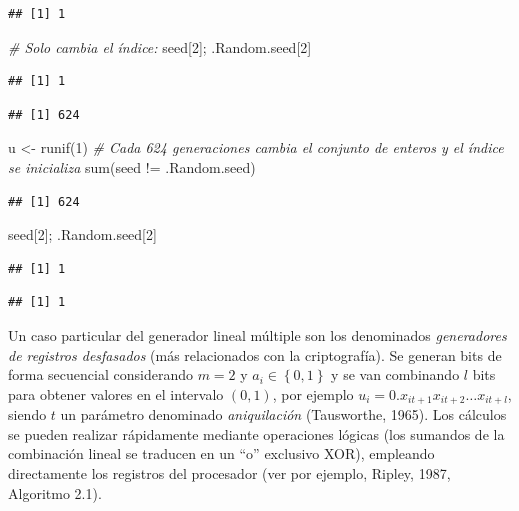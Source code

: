 \documentclass[
]{book}
\newenvironment{Shaded}{\begin{snugshade}}{\end{snugshade}}
\newcommand{\CommentTok}[1]{\textcolor[rgb]{0.56,0.35,0.01}{\textit{#1}}}
\newcommand{\DecValTok}[1]{\textcolor[rgb]{0.00,0.00,0.81}{#1}}
\newcommand{\FunctionTok}[1]{\textcolor[rgb]{0.00,0.00,0.00}{#1}}
\newcommand{\NormalTok}[1]{#1}
\newcommand{\OtherTok}[1]{\textcolor[rgb]{0.56,0.35,0.01}{#1}}
\newcommand{\SpecialCharTok}[1]{\textcolor[rgb]{0.00,0.00,0.00}{#1}}
\theoremstyle{break}
\theoremstyle{nonumberplain}
\begin{document}
\begin{verbatim}
## [1] 1
\end{verbatim}

\begin{Shaded}
\begin{Highlighting}[]
\CommentTok{\# Solo cambia el índice: }
\NormalTok{seed[}\DecValTok{2}\NormalTok{]; .Random.seed[}\DecValTok{2}\NormalTok{]}
\end{Highlighting}
\end{Shaded}

\begin{verbatim}
## [1] 1
\end{verbatim}

\begin{verbatim}
## [1] 624
\end{verbatim}

\begin{Shaded}
\begin{Highlighting}[]
\NormalTok{u }\OtherTok{\textless{}{-}} \FunctionTok{runif}\NormalTok{(}\DecValTok{1}\NormalTok{)}
\CommentTok{\# Cada 624 generaciones cambia el conjunto de enteros y el índice se inicializa}
\FunctionTok{sum}\NormalTok{(seed }\SpecialCharTok{!=}\NormalTok{ .Random.seed)}
\end{Highlighting}
\end{Shaded}

\begin{verbatim}
## [1] 624
\end{verbatim}

\begin{Shaded}
\begin{Highlighting}[]
\NormalTok{seed[}\DecValTok{2}\NormalTok{]; .Random.seed[}\DecValTok{2}\NormalTok{]}
\end{Highlighting}
\end{Shaded}

\begin{verbatim}
## [1] 1
\end{verbatim}

\begin{verbatim}
## [1] 1
\end{verbatim}

Un caso particular del generador lineal múltiple son los denominados \emph{generadores de registros desfasados} (más relacionados con la criptografía).
Se generan bits de forma secuencial considerando \(m=2\) y \(a_{i} \in \left \{ 0,1\right \}\) y se van combinando \(l\) bits para obtener valores en el intervalo \((0, 1)\), por ejemplo \(u_i = 0 . x_{it+1} x_{it+2} \ldots x_{it+l}\), siendo \(t\) un parámetro denominado \emph{aniquilación} (Tausworthe, 1965).
Los cálculos se pueden realizar rápidamente mediante operaciones lógicas (los sumandos de la combinación lineal se traducen en un ``o'' exclusivo XOR), empleando directamente los registros del procesador (ver por ejemplo, Ripley, 1987, Algoritmo 2.1).
\end{document}
